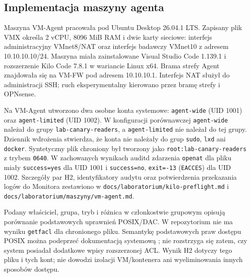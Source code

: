 
\subsection{Implementacja maszyny agenta}
\label{subsec:implementacja-vm-agent-propozycja}

Maszyna VM-Agent pracowała pod Ubuntu Desktop 26.04.1 LTS. Zapisany plik VMX
określa 2 vCPU, 8096 MiB RAM i dwie karty sieciowe: interfejs administracyjny
VMnet8/NAT oraz interfejs badawczy VMnet10 z adresem 10.10.10.10/24.
Maszyna miała zainstalowane Visual Studio Code 1.139.1 i rozszerzenie Kilo
Code 7.8.1 w wariancie Linux x64. Brama strefy Agent znajdowała się na
VM-FW pod adresem 10.10.10.1. Interfejs NAT służył do administracji SSH;
ruch eksperymentalny kierowano przez bramę strefy i OPNsense.

Na VM-Agent utworzono dwa osobne konta systemowe: \texttt{agent-wide}
(UID 1001) oraz \texttt{agent-limited} (UID 1002). W konfiguracji porównawczej
\texttt{agent-wide} należał do grupy \texttt{lab-canary-readers}, a
\texttt{agent-limited} nie należał do tej grupy. Dziennik wdrożenia stwierdza,
że konta nie należały do grup \texttt{sudo}, \texttt{lxd} ani \texttt{docker}.
Syntetyczny plik chroniony był tworzony jako \texttt{root:lab-canary-readers}
z trybem \texttt{0640}. W zachowanych wynikach auditd zdarzenia
\texttt{openat} dla pliku miały \texttt{success=yes} dla UID 1001 i
\texttt{success=no}, \texttt{exit=-13} (\texttt{EACCES}) dla UID 1002.
Szczegóły par H2, identyfikatory audytu oraz potwierdzenia przekazania logów
do Monitora zestawiono w \texttt{docs/laboratorium/kilo-preflight.md}
i \texttt{docs/laboratorium/maszyny/vm-agent.md}.

Podany właściciel, grupa, tryb i różnica w członkostwie grupowym opisują
porównanie podstawowych uprawnień POSIX/DAC. W repozytorium nie ma wyniku
\texttt{getfacl} dla chronionego pliku. Semantykę podstawowych praw dostępu POSIX
można podeprzeć dokumentacją systemową \cite{LinuxAclManual}; nie rozstrzyga się zatem, czy system
posiadał dodatkowe wpisy rozszerzonej ACL. Wynik H2 dotyczy tego pliku i tych
kont; nie dowodzi izolacji VM/kontenera ani wyeliminowania innych sposobów
dostępu.

